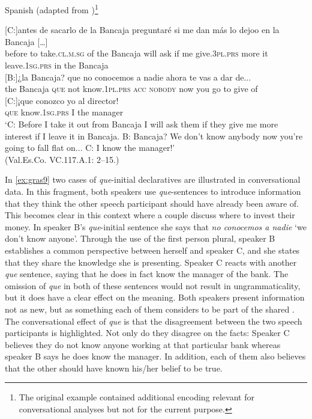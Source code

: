 \ea \label{ex:gras9}
Spanish (adapted from \citealt[121: ex 9]{Gras2016})\footnote{The original example contained additional encoding relevant for conversational analyses but not for the current purpose.}\\

\exi{}[C:]{\gll antes de sacarlo de la Bancaja preguntaré  si me dan más lo dejoo en la
Bancaja […]\\
before to take.\textsc{cl.m.sg} of the Bancaja {will ask} if me give.\textsc{3pl.prs} more it leave.\textsc{1sg.prs} in the Bancaja\\}
\exi{}[B:]{\gll ¿la Bancaja? que no conocemos a nadie ahora te vas a dar de...\\
the Bancaja \textsc{que} not know.\textsc{1pl.prs} \textsc{acc} \textsc{nobody} now  you go to give of  \\}
\exi{}[C:]{\gll  ¡que conozco yo al director!\\
 \textsc{que} know.\textsc{1sg.prs} I the manager\\}
\glt `C: Before I take it out from Bancaja I will ask them if they give me more
 interest if I leave it in Bancaja. B: Bancaja? We don’t know anybody now you’re going to fall flat on... C: I know the manager!'\\(Val.Es.Co. VC.117.A.1:  2–15.)
\z 

In \eqref{ex:gras9} two cases of \emph{que}-initial declaratives are illustrated in conversational data. In this fragment, both speakers use \emph{que}-sentences to introduce information that they think the other speech participant should have already been  aware of. This becomes clear in this context where a couple discuss where to invest their money. In speaker B's  \emph{que}-initial sentence she says that \emph{no conocemos a nadie} `we don't know anyone'. Through the use of the first person plural, speaker B establishes  a common perspective between herself and  speaker C, and she states that they share the knowledge she is presenting.  Speaker C  reacts with another \emph{que} sentence, saying that he does in fact know the manager of the bank. The omission of \emph{que} in both of these sentences would not result in ungrammaticality, but it does have a clear effect on the meaning. Both speakers present  information not as new, but as something each of them considers to be part of the shared . The conversational effect of \emph{que} is that the disagreement between the two speech participants is  highlighted.  Not only do they disagree on the facts: Speaker C believes they do not know anyone working at that particular bank whereas speaker B says he does know the manager. In addition, each of them also believes that the other should have known his/her belief to be true.


